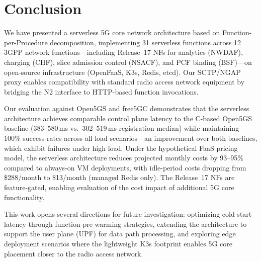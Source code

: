 \documentclass[conference]{IEEEtran}
\begin{document}
\section{Conclusion}
\label{sec:conclusion}

We have presented a serverless 5G core network architecture based on Function-per-Procedure decomposition, implementing 31 serverless functions across 12 3GPP network functions---including Release~17 NFs for analytics (NWDAF), charging (CHF), slice admission control (NSACF), and PCF binding (BSF)---on open-source infrastructure (OpenFaaS, K3s, Redis, etcd). Our SCTP/NGAP proxy enables compatibility with standard radio access network equipment by bridging the N2 interface to HTTP-based function invocations.

Our evaluation against Open5GS and free5GC demonstrates that the serverless architecture achieves comparable control plane latency to the C-based Open5GS baseline (383--580\,ms vs.\ 302--519\,ms registration median) while maintaining 100\% success rates across all load scenarios---an improvement over both baselines, which exhibit failures under high load. Under the hypothetical FaaS pricing model, the serverless architecture reduces projected monthly costs by 93--95\% compared to always-on VM deployments, with idle-period costs dropping from \$288/month to \$13/month (managed Redis only). The Release~17 NFs are feature-gated, enabling evaluation of the cost impact of additional 5G core functionality.

This work opens several directions for future investigation: optimizing cold-start latency through function pre-warming strategies, extending the architecture to support the user plane (UPF) for data path processing, and exploring edge deployment scenarios where the lightweight K3s footprint enables 5G core placement closer to the radio access network.


\end{document}
